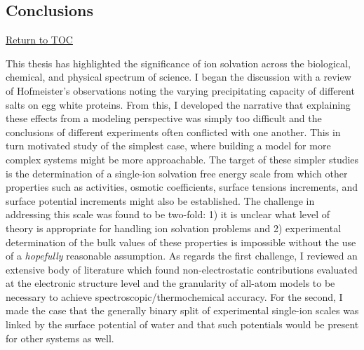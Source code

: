 \begin{conclude}
 \chapter{Conclusions~}
 \hyperlink{toc}{Return to TOC}
 
  This thesis has highlighted the significance of ion solvation across the biological, chemical, and physical spectrum of science. I began the discussion
  with a review of Hofmeister's observations noting the varying precipitating capacity of different salts on egg white proteins. From this, I developed
  the narrative that explaining these effects from a modeling perspective was simply too difficult and the conclusions of different experiments often
  conflicted with one another. This in turn motivated study of the simplest case, where building a model for more complex systems might be more approachable.
  The target of these simpler studies is the determination of a single-ion solvation free energy scale from which other properties such as activities, 
  osmotic coefficients, surface tensions increments, and surface potential increments might also be established. The challenge in addressing this scale 
  was found to be two-fold: 1) it is unclear what level of theory is appropriate for handling ion solvation problems and 2) experimental determination of
  the bulk values of these properties is impossible without the use of a \emph{hopefully} reasonable assumption. As regards the first challenge, I reviewed
  an extensive body of literature which found non-electrostatic contributions evaluated at the electronic structure level and the granularity of all-atom 
  models to be necessary to achieve spectroscopic/thermochemical accuracy. For the second, I made the case that the generally binary split of experimental
  single-ion scales was linked by the surface potential of water and that such potentials would be present for other systems as well.
  

\end{conclude}
